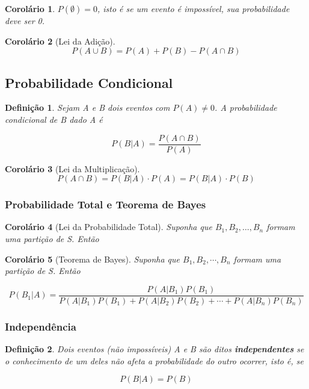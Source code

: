 \documentclass[12pt]{article}
\newtheorem{corollary}{Corolário}[theorem]
\newtheorem{definition}{Definição}
\begin{document}
\begin{corollary}
$P(\emptyset) = 0$, isto é se um evento é impossível, sua probabilidade deve ser 0.
\end{corollary}

\begin{corollary}[Lei da Adição]
$$P(A \cup B) = P(A) + P(B) - P(A \cap B)$$
\end{corollary}

\subsection*{Probabilidade Condicional}
\begin{definition}
Sejam A e B dois eventos com $P(A) \neq 0$. A probabilidade condicional de B dado A é

$$P(B|A) = \dfrac{P(A \cap B)}{P(A)}$$
\end{definition}

\begin{corollary}[Lei da Multiplicação]

$$P(A \cap B) = P(B|A) \cdot P(A) = P(B|A) \cdot P(B)$$

\end{corollary}

\subsubsection*{Probabilidade Total e Teorema de Bayes}
\begin{corollary}[Lei da Probabilidade Total]
Suponha que $B_1, B_2, \dots, B_n$ formam uma partição de S. Então


\end{corollary}

\begin{corollary}[Teorema de Bayes]
Suponha que $B_1, B_2, \cdots, B_n$ formam uma partição de S. Então

$$P(B_1|A) = \dfrac{P(A|B_1) P(B_1)}{P(A|B_1) P(B_1) + P(A|B_2) P(B_2) + \cdots + P(A|B_n) P(B_n)}$$

\end{corollary}

\subsubsection*{Independência}
\begin{definition}
Dois eventos (não impossíveis) A e B são ditos \textbf{independentes} se o conhecimento de um deles não afeta a probabilidade do outro ocorrer, isto é, se

$$P(B|A) = P(B)$$
\end{definition}
\end{document}
